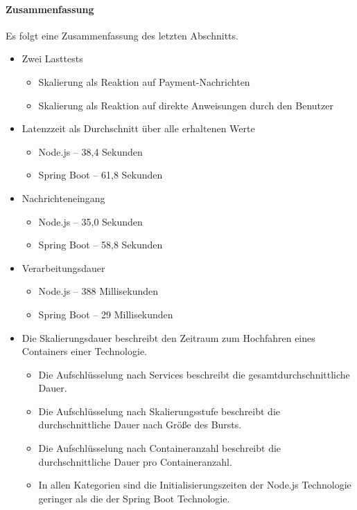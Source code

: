 \paragraph{Zusammenfassung}

Es folgt eine Zusammenfassung des letzten Abschnitts.

\begin{itemize}
	\item Zwei Lasttests
	\begin{itemize}
		\item Skalierung als Reaktion auf Payment-Nachrichten
		\item Skalierung als Reaktion auf direkte Anweisungen durch den Benutzer
	\end{itemize}
	\item Latenzzeit als Durchschnitt über alle erhaltenen Werte
	\begin{itemize}
		\item Node.js -- 38,4 Sekunden
		\item Spring Boot -- 61,8 Sekunden
	\end{itemize}
	\item Nachrichteneingang
	\begin{itemize}
		\item Node.js -- 35,0 Sekunden
		\item Spring Boot -- 58,8 Sekunden
	\end{itemize}
	\item Verarbeitungsdauer
	\begin{itemize}
		\item Node.js -- 388 Millisekunden
		\item Spring Boot -- 29 Millisekunden
	\end{itemize}
	\item Die Skalierungsdauer beschreibt den Zeitraum zum Hochfahren eines Containers einer Technologie.
	\begin{itemize}
		\item Die Aufschlüsselung nach Services beschreibt die gesamtdurchschnittliche Dauer.
		\item Die Aufschlüsselung nach Skalierungsstufe beschreibt die durchschnittliche Dauer nach Größe des Bursts.
		\item Die Aufschlüsselung nach Containeranzahl beschreibt die durchschnittliche Dauer pro Containeranzahl.
		\item In allen Kategorien sind die Initialisierungszeiten der Node.js Technologie geringer als die der Spring Boot Technologie.
	\end{itemize}
\end{itemize}


